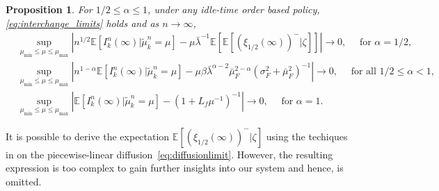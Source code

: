 \documentclass[a4paper,11pt,twoside]{article}
\numberwithin{equation}{section}
\numberwithin{figure}{section}
\theoremstyle{plain}
\newtheorem{proposition}[theorem]{Proposition}
\newcommand{\EE}{\mathbb{E}}
\newcommand{\1}{\mathbbm{1}}
\begin{document}
\begin{proposition}
\label{thm:interchange_idle_time_order}
For $1/2\leq \alpha\leq 1$, under any idle-time order based policy,  \eqref{eq:interchange_limits} holds and as $n\to\infty$,
\begin{align*}
&\sup_{\mu_{\min}\leq \mu\leq \mu_{\max}}\left|n^{1/2}\EE[I_k^n(\infty)|\tilde{\mu}_k^n=\mu]- \mu\bar{\lambda}^{-1}\EE\left[\EE[(\xi_{1/2}(\infty))^-|\zeta]\right]\right|\to 0,\quad \mbox{ for }\alpha=1/2,\\
&\sup_{\mu_{\min}\leq \mu\leq \mu_{\max}}\left|n^{1-\alpha}\EE[I_k^n(\infty)|\tilde{\mu}_k^n=\mu]- \mu\beta\bar{\lambda}^{\alpha-2}\bar{\mu}_F^{2-\alpha}(\sigma_F^2+\bar{\mu}_F^{2})^{-1}\right|\to 0,\quad \mbox{ for all }1/2\leq \alpha<1,
 \mbox{  }\\
&\sup_{\mu_{\min}\leq \mu\leq \mu_{\max}}\left|\EE[I_k^n(\infty)|\tilde{\mu}_k^n=\mu]- \left(1+L_f\mu^{-1}\right)^{-1}\right|\to 0,\quad  \mbox{ for }\alpha=1.
\end{align*}
\end{proposition}
It is possible to derive the expectation $\EE[(\xi_{1/2}(\infty))^-|\zeta]$ using the techiques in \cite{BrowneWhitt1995Piecewise} on the piecewise-linear diffusion~\eqref{eq:diffusionlimit}. However, the resulting expression is too complex to gain further insights into our system and hence, is omitted. 
\end{document}
